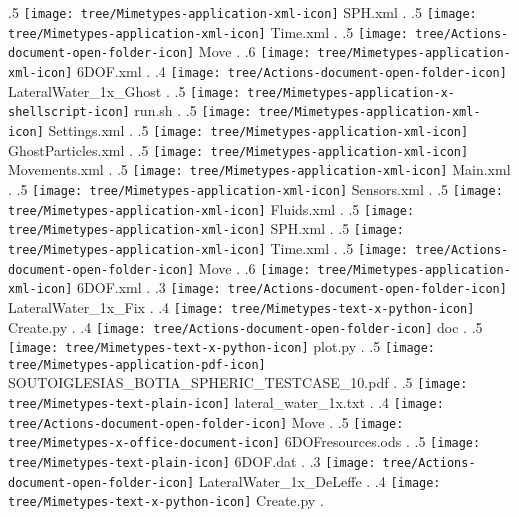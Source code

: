 {.5 { \texttt{[image: tree/Mimetypes-application-xml-icon]} SPH.xml }.
.5 { \texttt{[image: tree/Mimetypes-application-xml-icon]} Time.xml }.
.5 { \texttt{[image: tree/Actions-document-open-folder-icon]} Move }.
.6 { \texttt{[image: tree/Mimetypes-application-xml-icon]} 6DOF.xml }.
.4 { \texttt{[image: tree/Actions-document-open-folder-icon]} LateralWater\_1x\_Ghost }.
.5 { \texttt{[image: tree/Mimetypes-application-x-shellscript-icon]} run.sh }.
.5 { \texttt{[image: tree/Mimetypes-application-xml-icon]} Settings.xml }.
.5 { \texttt{[image: tree/Mimetypes-application-xml-icon]} GhostParticles.xml }.
.5 { \texttt{[image: tree/Mimetypes-application-xml-icon]} Movements.xml }.
.5 { \texttt{[image: tree/Mimetypes-application-xml-icon]} Main.xml }.
.5 { \texttt{[image: tree/Mimetypes-application-xml-icon]} Sensors.xml }.
.5 { \texttt{[image: tree/Mimetypes-application-xml-icon]} Fluids.xml }.
.5 { \texttt{[image: tree/Mimetypes-application-xml-icon]} SPH.xml }.
.5 { \texttt{[image: tree/Mimetypes-application-xml-icon]} Time.xml }.
.5 { \texttt{[image: tree/Actions-document-open-folder-icon]} Move }.
.6 { \texttt{[image: tree/Mimetypes-application-xml-icon]} 6DOF.xml }.
.3 { \texttt{[image: tree/Actions-document-open-folder-icon]} LateralWater\_1x\_Fix }.
.4 { \texttt{[image: tree/Mimetypes-text-x-python-icon]} Create.py }.
.4 { \texttt{[image: tree/Actions-document-open-folder-icon]} doc }.
.5 { \texttt{[image: tree/Mimetypes-text-x-python-icon]} plot.py }.
.5 { \texttt{[image: tree/Mimetypes-application-pdf-icon]} SOUTOIGLESIAS\_BOTIA\_SPHERIC\_TESTCASE\_10.pdf }.
.5 { \texttt{[image: tree/Mimetypes-text-plain-icon]} lateral\_water\_1x.txt }.
.4 { \texttt{[image: tree/Actions-document-open-folder-icon]} Move }.
.5 { \texttt{[image: tree/Mimetypes-x-office-document-icon]} 6DOFresources.ods }.
.5 { \texttt{[image: tree/Mimetypes-text-plain-icon]} 6DOF.dat }.
.3 { \texttt{[image: tree/Actions-document-open-folder-icon]} LateralWater\_1x\_DeLeffe }.
.4 { \texttt{[image: tree/Mimetypes-text-x-python-icon]} Create.py }.
}
